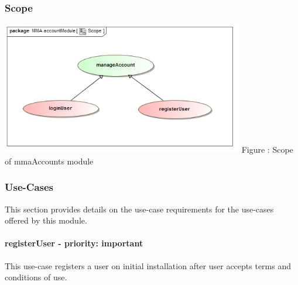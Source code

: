 \documentclass[hidelinks, 12pt, oneside]{article}
\begin{document}
	\subsubsection{Scope}
	\includegraphics[width=400px,height=220px]{img/scopeAccounts.jpg}
		Figure : Scope of mmaAccounts module
	\subsubsection{Use-Cases}
		This section provides details on the use-case requirements for the use-cases offered by this module.
	\paragraph{registerUser - priority: important}
		This use-case registers a user on initial installation after user accepts terms and conditions of use.\newline
\end{document}
